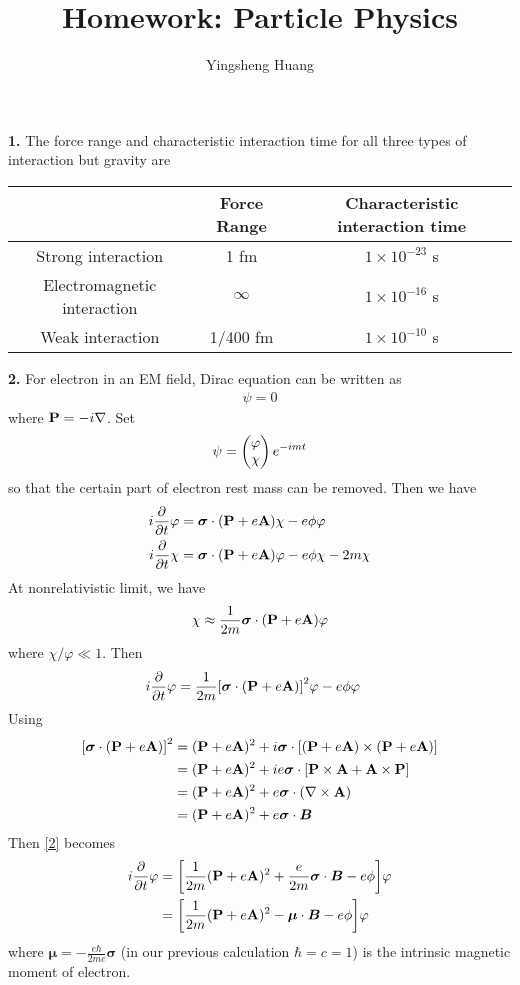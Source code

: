 \documentclass{article}
\title{Homework: Particle Physics}
\author{Yingsheng Huang}
\newcommand{\bP}{\vb{P}}
\newcommand{\bA}{\vb{A}}
\newcommand{\ba}{\boldsymbol{\alpha}}
\begin{document}
\maketitle

{\bf1.} The force range and characteristic interaction time for all three types of interaction but gravity are

\begin{center}
\begin{tabular}{ccc}
  \hline
  &Force Range&Characteristic interaction time\\\hline
  Strong interaction&1 fm&$1\times10^{-23}$ s\\\hline
  Electromagnetic interaction&$\infty$&$1\times10^{-16}$ s\\\hline
  Weak interaction&1/400 fm&$1\times10^{-10}$ s\\\hline
\end{tabular}
\end{center}

{\bf2.} For electron in an EM field, Dirac equation can be written as\cite{JINYAN}
\begin{align}
  [i\pdv{t}+e\phi-\ba\cdot(\bP+e\bA)-m\beta]\psi=0
\end{align}
where $\bP=-i\nabla$.
Set
\begin{align*}
  \psi=\pmqty{\varphi\\\chi}e^{-imt}
\end{align*}
so that the certain part of electron rest mass can be removed. Then we have
\begin{align*}
  i\pdv{t}\varphi&=\bm{\sigma}\cdot(\bP+e\bA)\chi-e\phi\varphi\\
  i\pdv{t}\chi&=\bm{\sigma}\cdot(\bP+e\bA)\varphi-e\phi\chi-2m\chi\\
\end{align*}
At nonrelativistic limit, we have
\begin{align}\label{2}
  \chi\approx\frac{1}{2m}\bm{\sigma}\cdot(\bP+e\bA)\varphi
\end{align}
where $\chi/\varphi\ll1$. Then
\begin{align*}
  i\pdv{t}\varphi&=\frac{1}{2m}\bqty{\bm{\sigma}\cdot(\bP+e\bA)}^2\varphi-e\phi\varphi
\end{align*}
Using
\begin{align*}
  \bqty{\bm{\sigma}\cdot(\bP+e\bA)}^2&=(\bP+e\bA)^2+i\bm{\sigma}\cdot\bqty{(\bP+e\bA)\times(\bP+e\bA)}\\
  &=(\bP+e\bA)^2+ie\bm{\sigma}\cdot\bqty{\bP\times\bA+\bA\times\bP}\\
  &=(\bP+e\bA)^2+e\bm{\sigma}\cdot(\nabla\times\bA)\\
  &=(\bP+e\bA)^2+e\bm{\sigma}\cdot\bm{B}
\end{align*}
Then \eqref{2} becomes
\begin{align*}
  i\pdv{t}\varphi&=\bqty{\frac{1}{2m}(\bP+e\bA)^2+\frac{e}{2m}\bm{\sigma}\cdot\bm{B}-e\phi}\varphi\\
  &=\bqty{\frac{1}{2m}(\bP+e\bA)^2-\bm{\mu}\cdot\bm{B}-e\phi}\varphi
\end{align*}
where $\bm{\mu}=-\frac{e\hbar}{2mc}\bm{\sigma}$ (in our previous calculation $\hbar=c=1$) is the intrinsic magnetic moment of electron.
\end{document}
